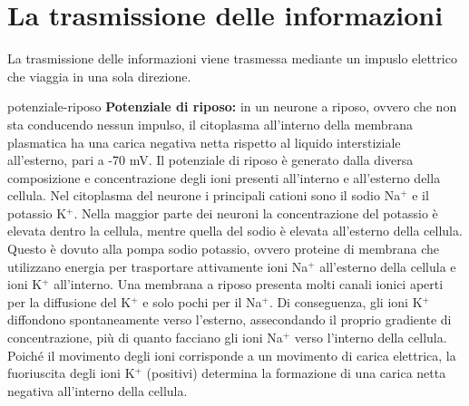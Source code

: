 \documentclass[preview]{standalone}
\begin{document}
\genpage

\section{La trasmissione delle informazioni}

\begin{plainhtml}
    La trasmissione delle informazioni viene trasmessa mediante un impuslo elettrico
    che viaggia in una sola direzione.
\end{plainhtml}

\begin{snippet}{potenziale-riposo}
    \textbf{Potenziale di riposo:} in un neurone a riposo, ovvero che non sta conducendo nessun impulso, il citoplasma
all'interno della membrana plasmatica ha una carica negativa netta rispetto al liquido
interstiziale all'esterno, pari a -70 mV. Il potenziale di riposo è generato dalla diversa
composizione e concentrazione degli ioni presenti all'interno e all'esterno della cellula. Nel
citoplasma del neurone i principali cationi sono il sodio Na\({}^+\) e il potassio K\({}^+\). Nella maggior
parte dei neuroni la concentrazione del potassio è elevata dentro la cellula, mentre quella
del sodio è elevata all'esterno della cellula. Questo è dovuto alla pompa sodio potassio,
ovvero proteine di membrana che utilizzano energia per trasportare attivamente ioni Na\({}^+\)
all'esterno della cellula e ioni K\({}^+\) all'interno. Una membrana a riposo presenta molti canali
ionici aperti per la diffusione del K\({}^+\) e solo pochi per il Na\({}^+\). Di conseguenza, gli ioni K\({}^+\)
diffondono spontaneamente verso l'esterno, assecondando il proprio gradiente di
concentrazione, più di quanto facciano gli ioni Na\({}^+\) verso l'interno della cellula. Poiché il
movimento degli ioni corrisponde a un movimento di carica elettrica, la fuoriuscita degli ioni
K\({}^+\) (positivi) determina la formazione di una carica netta negativa all'interno della cellula.
\end{snippet}

\end{document}
